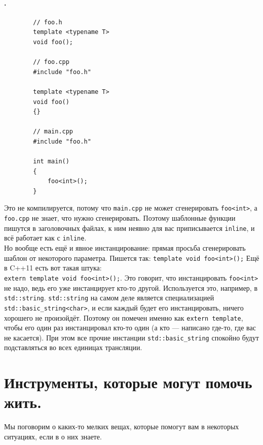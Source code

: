 \documentclass{article}
\begin{document}
    \paragraph{.}
    \begin{verbatim}
        // foo.h
        template <typename T>
        void foo();

        // foo.cpp
        #include "foo.h"

        template <typename T>
        void foo()
        {}

        // main.cpp
        #include "foo.h"

        int main()
        {
            foo<int>();
        }
    \end{verbatim}
    Это не компилируется, потому что \texttt{main.cpp} не может сгенерировать \texttt{foo<int>}, а \texttt{foo.cpp} не знает, что нужно сгенерировать. Поэтому шаблонные функции пишутся в заголовочных файлах, к ним неявно для вас приписывается \texttt{inline}, и всё работает как с \texttt{inline}.\\
    Но вообще есть ещё и явное инстанцирование: прямая просьба сгенерировать шаблон от некоторого параметра. Пишется так: \texttt{template void foo<int>();} Ещё в C++11 есть вот такая штука:\\\texttt{extern template void foo<int>();}. Это говорит, что инстанцировать \texttt{foo<int>} не надо, ведь его уже инстанцирует кто-то другой. Используется это, например, в \texttt{std::string}. \texttt{std::string} на самом деле является специализацией \texttt{std::basic_string<char>}, и если каждый будет его инстанцировать, ничего хорошего не произойдёт. Поэтому он помечен именно как \texttt{extern template}, чтобы его один раз инстанцировал кто-то один (а кто --- написано где-то, где вас не касается). При этом все прочие инстанции \texttt{std::basic_string} спокойно будут подставляться во всех единицах трансляции.
    \section{Инструменты, которые могут помочь жить.}
    Мы поговорим о каких-то мелких вещах, которые помогут вам в некоторых ситуациях, если в о них знаете.
\end{document}
